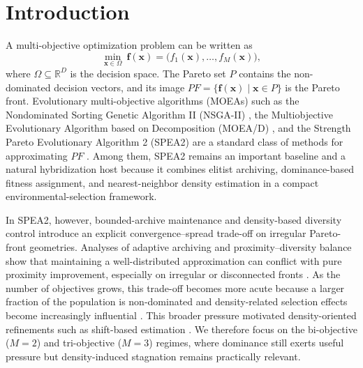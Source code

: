\documentclass[pdflatex,sn-mathphys-ay]{sn-jnl}%
\theoremstyle{thmstyleone}%
\theoremstyle{thmstyletwo}%
\theoremstyle{thmstylethree}%
\begin{document}

\maketitle

\section{Introduction}\label{sec1}

A multi-objective optimization problem can be written as
\[
	\min_{\mathbf{x}\in\Omega}\ \mathbf{f}(\mathbf{x}) = \bigl(f_1(\mathbf{x}),\ldots,f_M(\mathbf{x})\bigr),
\]
where $\Omega \subseteq \mathbb{R}^D$ is the decision space. The Pareto set $P$ contains the non-dominated decision vectors, and its image $PF = \{\mathbf{f}(\mathbf{x}) \mid \mathbf{x}\in P\}$ is the Pareto front. Evolutionary multi-objective algorithms (MOEAs) such as the Nondominated Sorting Genetic Algorithm II (NSGA-II) \citep{deb2002fast}, the Multiobjective Evolutionary Algorithm based on Decomposition (MOEA/D) \citep{zhang2007moead}, and the Strength Pareto Evolutionary Algorithm 2 (SPEA2) \citep{zitzler2001spea2} are a standard class of methods for approximating $PF$ \citep{zhou2011multiobjective}. Among them, SPEA2 remains an important baseline and a natural hybridization host because it combines elitist archiving, dominance-based fitness assignment, and nearest-neighbor density estimation in a compact environmental-selection framework.

In SPEA2, however, bounded-archive maintenance and density-based diversity control introduce an explicit convergence--spread trade-off on irregular Pareto-front geometries. Analyses of adaptive archiving and proximity--diversity balance show that maintaining a well-distributed approximation can conflict with pure proximity improvement, especially on irregular or disconnected fronts \citep{knowles2003properties, bosman2003balance}. As the number of objectives grows, this trade-off becomes more acute because a larger fraction of the population is non-dominated and density-related selection effects become increasingly influential \citep{ishibuchi2008evolutionary, li2015many}. This broader pressure motivated density-oriented refinements such as shift-based estimation \citep{li2014shift}. We therefore focus on the bi-objective ($M=2$) and tri-objective ($M=3$) regimes, where dominance still exerts useful pressure but density-induced stagnation remains practically relevant.
\end{document}
